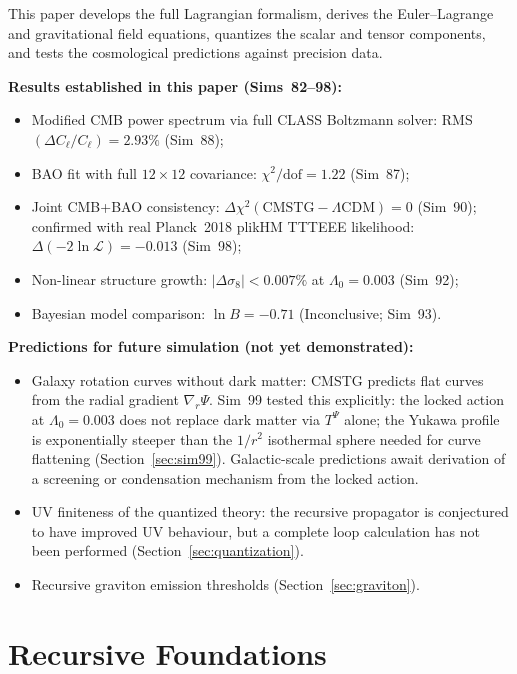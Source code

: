 \documentclass[12pt,a4paper]{article}
\begin{document}
This paper develops the full Lagrangian formalism, derives the Euler--Lagrange
and gravitational field equations, quantizes the scalar and tensor components,
and tests the cosmological predictions against precision data.

\noindent\textbf{Results established in this paper (Sims~82--98):}
\begin{itemize}
  \item Modified CMB power spectrum via full CLASS Boltzmann solver:
        RMS$(\Delta C_\ell/C_\ell) = 2.93\%$ (Sim~88);
  \item BAO fit with full $12\times12$ covariance:
        $\chi^2/\mathrm{dof} = 1.22$ (Sim~87);
  \item Joint CMB+BAO consistency: $\Delta\chi^2(\mathrm{CMSTG}-\Lambda\mathrm{CDM}) = 0$
        (Sim~90); confirmed with real Planck~2018 plikHM TTTEEE likelihood:
        $\Delta(-2\ln\mathcal{L}) = -0.013$ (Sim~98);
  \item Non-linear structure growth: $|\Delta\sigma_8| < 0.007\%$ at
        $\Lambda_0 = 0.003$ (Sim~92);
  \item Bayesian model comparison: $\ln B = -0.71$ (Inconclusive; Sim~93).
\end{itemize}

\noindent\textbf{Predictions for future simulation (not yet demonstrated):}
\begin{itemize}
  \item Galaxy rotation curves without dark matter: CMSTG predicts flat curves
        from the radial gradient $\nabla_r\Psi$. Sim~99 tested this explicitly:
        the locked action at $\Lambda_0 = 0.003$ does not replace dark matter via
        $T^{\Psi}$ alone; the Yukawa profile is exponentially steeper than the
        $1/r^2$ isothermal sphere needed for curve flattening
        (Section~\ref{sec:sim99}). Galactic-scale predictions await derivation
        of a screening or condensation mechanism from the locked action.
  \item UV finiteness of the quantized theory: the recursive propagator is
        conjectured to have improved UV behaviour, but a complete loop calculation
        has not been performed (Section~\ref{sec:quantization}).
  \item Recursive graviton emission thresholds (Section~\ref{sec:graviton}).
\end{itemize}

\section{Recursive Foundations}
\label{sec:foundations}
\end{document}
